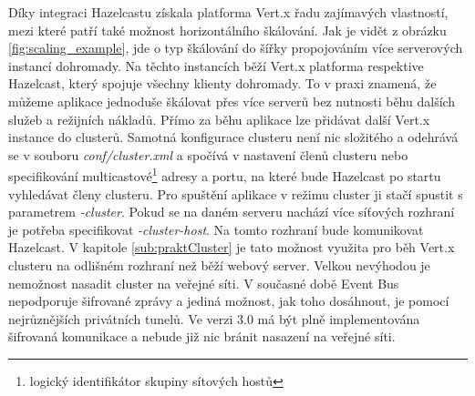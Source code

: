 Díky integraci Hazelcastu získala platforma Vert.x řadu zajímavých vlastností, mezi které patří také možnost horizontálního škálování. Jak je vidět z obrázku \ref{fig:scaling_example}, jde o typ škálování do šířky propojováním více serverových instancí dohromady. Na těchto instancích běží Vert.x platforma respektive Hazelcast, který spojuje všechny klienty dohromady. To v praxi znamená, že můžeme aplikace jednoduše škálovat přes více serverů bez nutnosti běhu dalších služeb a režijních nákladů. Přímo za běhu aplikace lze přidávat další Vert.x instance do clusterů. Samotná konfigurace clusteru není nic složitého a odehrává se v souboru \emph{conf/cluster.xml} a spočívá v nastavení členů clusteru nebo specifikování multicastové\footnote{logický identifikátor skupiny sítových hostů} adresy a portu, na které bude Hazelcast po startu vyhledávat členy clusteru. Pro spuštění aplikace v režimu cluster ji stačí spustit s parametrem \emph{-cluster}. Pokud se na daném serveru nachází více síťových rozhraní je potřeba specifikovat \emph{-cluster-host}. Na tomto rozhraní bude komunikovat Hazelcast. V kapitole \ref{sub:praktCluster} je tato možnost využita pro běh Vert.x clusteru na odlišném rozhraní než běží webový server.
Velkou nevýhodou je nemožnost nasadit cluster na veřejné síti. V současné době Event Bus nepodporuje šifrované zprávy a jediná možnost, jak toho dosáhnout, je pomocí nejrůznějších privátních tunelů. Ve verzi 3.0 má být plně implementována šifrovaná komunikace a nebude již nic bránit nasazení na veřejné síti.

